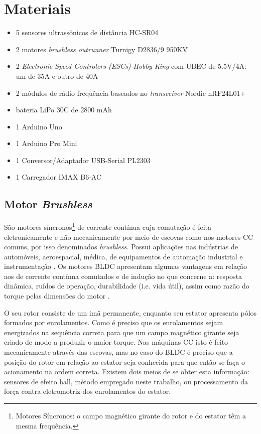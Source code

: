 \chapter{Materiais}
\begin{itemize} %
 \item 5 sensores ultrassônicos de distância HC-SR04
 \item 2 motores \textit{brushless outrunner} Turnigy D2836/9 950KV
 \item 2 \textit{Electronic Speed Controlers (ESCs) Hobby King} com UBEC de 5.5V/4A: um de 35A e outro de 40A 
 \item 2 módulos de rádio frequência baseados no \textit{transceiver} Nordic nRF24L01+ 
 \item bateria LiPo 30C de 2800 mAh
 \item 1 Arduino Uno
 \item 1 Arduino Pro Mini
 \item 1 Conversor/Adaptador USB-Serial PL2303
 \item 1 Carregador IMAX B6-AC
\end{itemize}

\section{Motor \textit{Brushless}}
São motores síncronos\footnote{Motores Síncronos: o campo magnético girante do rotor e do estator têm a mesma frequência.} de corrente contínua cuja 
comutação é feita eletronicamente e não mecanicamente por meio de escovas como nos motores CC comuns, por isso denominados \textit{brushless}.
Possui aplicações nas indústrias de automóveis, aeroespacial, médica, de equipamentos de automação industrial e instrumentação .
Os motores BLDC apresentam algumas vantagens em relação aos de corrente contínua comutados e de indução no que concerne a: resposta dinâmica, ruídos 
de operação, durabilidade (i.e. vida útil), assim como razão do torque pelas dimensões do motor \cite{motor_2}. 

O seu rotor consiste de um imã permanente, enquanto seu estator apresenta pólos formados por enrolamentos. Como é preciso que os enrolamentos sejam 
energizados na sequência correta para que um campo magnético girante seja criado de modo a produzir o maior torque. Nas máquinas CC isto é feito 
mecanicamente através das escovas, mas no caso do BLDC é preciso que a posição do rotor em relação ao estator seja conhecida para que então se faça o 
acionamento na ordem correta. Existem dois meios de se obter esta informação: sensores de efeito hall, método empregado neste trabalho, ou 
processamento da força contra eletromotriz dos enrolamentos do estator.

